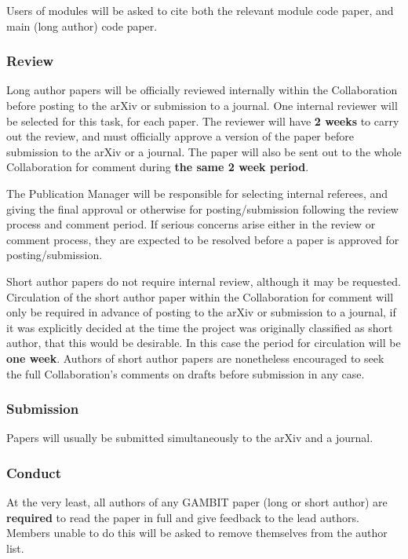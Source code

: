 Users of modules will be asked to cite both the relevant module code paper, and main (long author) code paper.

\subsubsection{Review}

Long author papers will be officially reviewed internally within the Collaboration before posting to the arXiv or submission to a journal.  One internal reviewer will be selected for this task, for each paper.  The reviewer will have \textbf{2 weeks} to carry out the review, and must officially approve a version of the paper before submission to the arXiv or a journal.  The paper will also be sent out to the whole Collaboration for comment during \textbf{the same 2 week period}.

The Publication Manager will be responsible for selecting internal referees, and giving the final approval or otherwise for posting/submission following the review process and comment period.  If serious concerns arise either in the review or comment process, they are expected to be resolved before a paper is approved for posting/submission.

Short author papers do not require internal review, although it may be requested.  Circulation of the short author paper within the Collaboration for comment will only be required in advance of posting to the arXiv or submission to a journal, if it was explicitly decided at the time the project was originally classified as short author, that this would be desirable.  In this case the period for circulation will be \textbf{one week}.  Authors of short author papers are nonetheless encouraged to seek the full Collaboration's comments on drafts before submission in any case.

\subsubsection{Submission}

Papers will usually be submitted simultaneously to the arXiv and a journal.

\subsubsection{Conduct}

At the very least, all authors of any GAMBIT paper (long or short author) are \textbf{required} to read the paper in full and give feedback to the lead authors.  Members unable to do this will be asked to remove themselves from the author list.

